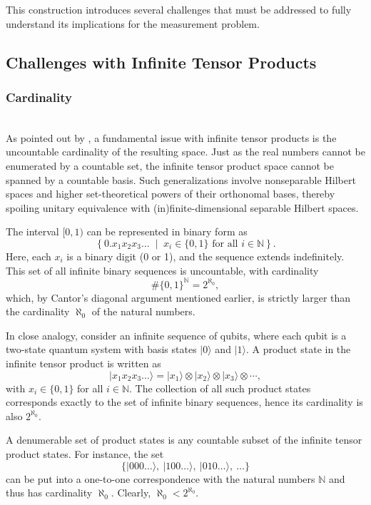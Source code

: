 \documentclass[shortAfour,sageh,times]{sagej}
\begin{document}
This construction introduces several challenges that must be addressed to fully understand its implications for the measurement problem.



\subsection{Challenges with Infinite Tensor Products}

\subsubsection{Cardinality} \hfill\\[-0.1in]

As pointed out by \cite{vonNeumann1939}, a fundamental issue with infinite tensor products is the uncountable cardinality of the resulting space.
Just as the real numbers cannot be enumerated by a countable set, the infinite tensor product space cannot be spanned by a countable basis.
Such generalizations involve nonseparable Hilbert spaces and higher set-theoretical powers of their orthonomal bases, thereby spoiling unitary equivalence with (in)finite-dimensional separable Hilbert spaces.


The interval \([0,1)\) can be represented in binary form as
\[
\left\{ 0.x_1x_2x_3\ldots \; \middle| \; x_i \in \{0,1\} \text{ for all } i \in \mathbb{N} \right\}.
\]
Here, each \(x_i\) is a binary digit (0 or 1), and the sequence extends indefinitely. This set of all infinite binary sequences is uncountable, with cardinality
\[
\#\{0,1\}^{\mathbb{N}} = 2^{\aleph_0},
\]
which, by Cantor's diagonal argument mentioned earlier, is strictly larger than the cardinality \(\aleph_0\) of the natural numbers.

In close analogy, consider an infinite sequence of qubits, where each qubit is a two-state quantum system with basis states \(\lvert 0 \rangle\) and \(\lvert 1 \rangle\). A product state in the infinite tensor product is written as
\[
\lvert x_1 x_2 x_3 \ldots \rangle = \lvert x_1 \rangle \otimes \lvert x_2 \rangle \otimes \lvert x_3 \rangle \otimes \cdots,
\]
with \(x_i \in \{0,1\}\) for all \(i \in \mathbb{N}\). The collection of all such product states corresponds exactly to the set of infinite binary sequences, hence its cardinality is also \(2^{\aleph_0}\).


A denumerable set of product states is any countable subset of the infinite tensor product states. For instance, the set
\[
\Big\{ \lvert 000\ldots \rangle,\ \lvert 100\ldots \rangle,\ \lvert 010\ldots \rangle,\ \ldots \Big\}
\]
can be put into a one-to-one correspondence with the natural numbers \(\mathbb{N}\) and thus has cardinality \(\aleph_0\). Clearly, \(\aleph_0 < 2^{\aleph_0}\).
\end{document}
